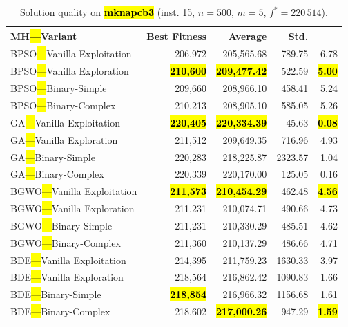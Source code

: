 \documentclass[mathematics,article,accept,moreauthors]{Definitions/mdpi}
\begin{document}
\begin{table}[H]
  \small
  \caption{Solution quality on \textbf{\hl{mknapcb3}} (inst. 15, $n=500$, $m=5$, $f^*=220\,514$).}
  \label{tab:calidad_mknapcb3_15}
  \begin{tabularx}{\textwidth}{lRRRR}
    \toprule
    \textbf{MH\hl{---}Variant} &
    \textbf{Best Fitness} &
    \textbf{Average} &
    \textbf{Std.} &
    \textbf{} \\
    \midrule
    BPSO\hl{---}Vanilla Exploitation &         206,972 &        205,565.68 & 789.75 &         6.78 \\
    BPSO\hl{---}Vanilla Exploration  & \textbf{\hl{210,600}} & \textbf{\hl{209,477.42}} & 522.59 & \textbf{\hl{5.00}} \\
    BPSO\hl{---}Binary-Simple        &         209,660 &        208,966.10 & 458.41 &         5.24 \\
    BPSO\hl{---}Binary-Complex       &         210,213 &        208,905.10 & 585.05 &         5.26 \\
    \midrule
    GA\hl{---}Vanilla Exploitation   & \textbf{\hl{220,405}} & \textbf{\hl{220,334.39}} &  45.63 & \textbf{\hl{0.08}} \\
    GA\hl{---}Vanilla Exploration    &         211,512 &        209,649.35 & 716.96 &         4.93 \\
    GA\hl{---}Binary-Simple          &         220,283 &        218,225.87 & 2323.57 &         1.04 \\
    GA\hl{---}Binary-Complex         &         220,339 &        220,170.00 & 125.05 &         0.16 \\
    \midrule
    BGWO\hl{---}Vanilla Exploitation & \textbf{\hl{211,573}} & \textbf{\hl{210,454.29}} & 462.48 & \textbf{\hl{4.56}} \\
    BGWO\hl{---}Vanilla Exploration  &         211,231 &        210,074.71 & 490.66 &         4.73 \\
    BGWO\hl{---}Binary-Simple        &         211,231 &        210,330.29 & 485.51 &         4.62 \\
    BGWO\hl{---}Binary-Complex       &         211,360 &        210,137.29 & 486.66 &         4.71 \\
    \midrule
    BDE\hl{---}Vanilla Exploitation  &         214,395 &        211,759.23 & 1630.33 &         3.97 \\
    BDE\hl{---}Vanilla Exploration   &         218,564 &        216,862.42 & 1090.83 &         1.66 \\
    BDE\hl{---}Binary-Simple         & \textbf{\hl{218,854}} &        216,966.32 & 1156.68 &         1.61 \\
    BDE\hl{---}Binary-Complex        &         218,602 & \textbf{\hl{217,000.26}} & 947.29 & \textbf{\hl{1.59}} \\
    \bottomrule
  \end{tabularx}
\end{table}
\end{document}
